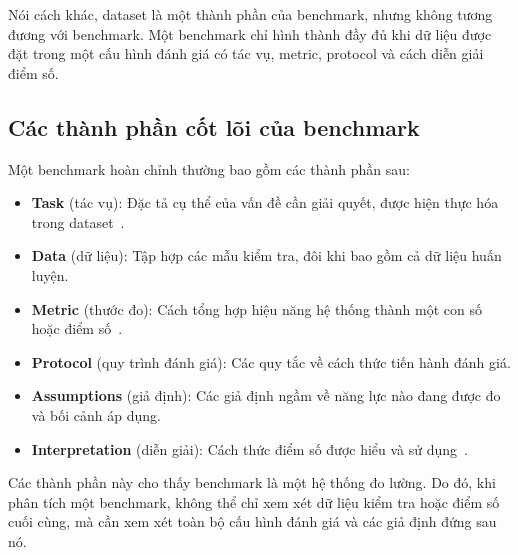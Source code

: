 Nói cách khác, dataset là một thành phần của benchmark, nhưng không tương đương với benchmark. Một benchmark chỉ hình thành đầy đủ khi dữ liệu được đặt trong một cấu hình đánh giá có tác vụ, metric, protocol và cách diễn giải điểm số.

\subsection{Các thành phần cốt lõi của benchmark}
\label{sec:benchmark_components}

Một benchmark hoàn chỉnh thường bao gồm các thành phần sau:

\begin{itemize}
    \item \textbf{Task} (tác vụ): Đặc tả cụ thể của vấn đề cần giải quyết, được hiện thực hóa trong dataset~\cite{everything_benchmark}.
    \item \textbf{Data} (dữ liệu): Tập hợp các mẫu kiểm tra, đôi khi bao gồm cả dữ liệu huấn luyện.
    \item \textbf{Metric} (thước đo): Cách tổng hợp hiệu năng hệ thống thành một con số hoặc điểm số~\cite{everything_benchmark}.
    \item \textbf{Protocol} (quy trình đánh giá): Các quy tắc về cách thức tiến hành đánh giá.
    \item \textbf{Assumptions} (giả định): Các giả định ngầm về năng lực nào đang được đo và bối cảnh áp dụng.
    \item \textbf{Interpretation} (diễn giải): Cách thức điểm số được hiểu và sử dụng~\cite{measuring_what_matters}.
\end{itemize}

Các thành phần này cho thấy benchmark là một hệ thống đo lường. Do đó, khi phân tích một benchmark, không thể chỉ xem xét dữ liệu kiểm tra hoặc điểm số cuối cùng, mà cần xem xét toàn bộ cấu hình đánh giá và các giả định đứng sau nó.


\small
\setlength{\tabcolsep}{6pt}
\renewcommand{\arraystretch}{1.2}

